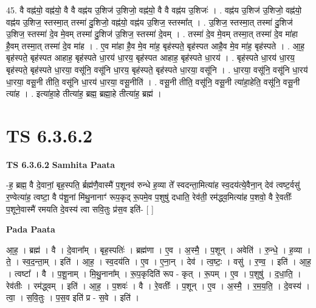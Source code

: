 \documentclass[17pt]{extarticle}
\begin{document}
45. वै वह्न॑यो॒ वह्न॑यो॒ वै वै वह्न॑य उ॒शिज॑ उ॒शिजो॒ वह्न॑यो॒ वै वै वह्न॑य उ॒शिजः॑ । . वह्न॑य उ॒शिज॑ उ॒शिजो॒ वह्न॑यो॒ वह्न॑य उ॒शिज॒ स्तस्मा॒त् तस्मा॑ दु॒शिजो॒ वह्न॑यो॒ वह्न॑य उ॒शिज॒ स्तस्मा᳚त् । . उ॒शिज॒ स्तस्मा॒त् तस्मा॑ दु॒शिज॑ उ॒शिज॒ स्तस्मा॑ दे॒व मे॒वम् तस्मा॑ दु॒शिज॑ उ॒शिज॒ स्तस्मा॑ दे॒वम् । . तस्मा॑ दे॒व मे॒वम् तस्मा॒त् तस्मा॑ दे॒व मा॑हा है॒वम् तस्मा॒त् तस्मा॑ दे॒व मा॑ह । . ए॒व मा॑हा है॒व मे॒व मा॑ह॒ बृह॑स्पते॒ बृह॑स्पत आहै॒व मे॒व मा॑ह॒ बृह॑स्पते । . आ॒ह॒ बृह॑स्पते॒ बृह॑स्पत आहाह॒ बृह॑स्पते धा॒रय॑ धा॒रय॒ बृह॑स्पत आहाह॒ बृह॑स्पते धा॒रय॑ । . बृह॑स्पते धा॒रय॑ धा॒रय॒ बृह॑स्पते॒ बृह॑स्पते धा॒रया॒ वसू॑नि॒ वसू॑नि धा॒रय॒ बृह॑स्पते॒ बृह॑स्पते धा॒रया॒ वसू॑नि । . धा॒रया॒ वसू॑नि॒ वसू॑नि धा॒रय॑ धा॒रया॒ वसू॒नी तीति॒ वसू॑नि धा॒रय॑ धा॒रया॒ वसू॒नीति॑ । . वसू॒नी तीति॒ वसू॑नि॒ वसू॒नी त्या॑हा॒हेति॒ वसू॑नि॒ वसू॒नी त्या॑ह । . इत्या॑हा॒हे तीत्या॑ह॒ ब्रह्म॒ ब्रह्मा॒हे तीत्या॑ह॒ ब्रह्म॑ । \newline
\pagebreak
{}

\section{ TS 6.3.6.2 }

\textbf{TS 6.3.6.2 } \newline
\textbf{Samhita Paata} \newline

-ह॒ ब्रह्म॒ वै दे॒वानां॒ बृह॒स्पति॒ र्ब्रह्म॑णै॒वास्मै॑ प॒शूनव॑ रुन्धे ह॒व्या ते᳚ स्वदन्ता॒मित्या॑ह स्व॒दय॑त्ये॒वैना॒न् देव॑ त्वष्ट॒र्वसु॑ र॒ण्वेत्या॑ह॒ त्वष्टा॒ वै प॑शू॒नां मि॑थु॒नानाꣳ॑ रूप॒कृद् रू॒पमे॒व प॒शुषु॑ दधाति॒ रेव॑ती॒ रम॑द्ध्व॒मित्या॑ह प॒शवो॒ वै रे॒वतीः᳚ प॒शूने॒वास्मै॑ रमयति दे॒वस्य॑ त्वा सवि॒तुः प्र॑स॒व इति॑- [  ] \newline

\textbf{Pada Paata} \newline

आ॒ह॒ । ब्रह्म॑ । वै । दे॒वाना᳚म् । बृह॒स्पतिः॑ । ब्रह्म॑णा । ए॒व । अ॒स्मै॒ । प॒शून् । अवेति॑ । रु॒न्धे॒ । ह॒व्या । ते॒ । स्व॒द॒न्ता॒म् । इति॑ । आ॒ह॒ । स्व॒दय॑ति । ए॒व । ए॒ना॒न् । देव॑ । त्व॒ष्टः॒ । वसु॑ । र॒ण्व॒ । इति॑ । आ॒ह॒ । त्वष्टा᳚ । वै । प॒शू॒नाम् । मि॒थु॒नाना᳚म् । रू॒प॒कृदिति॑ रूप - कृत् । रू॒पम् । ए॒व । प॒शुषु॑ । द॒धा॒ति॒ । रेव॑तीः । रम॑द्ध्वम् । इति॑ । आ॒ह॒ । प॒शवः॑ । वै । रे॒वतीः᳚ । प॒शून् । ए॒व । अ॒स्मै॒ । र॒म॒य॒ति॒ । दे॒वस्य॑ । त्वा॒ । स॒वि॒तुः । प॒स॒व इति॑ प्र - स॒वे । इति॑ ।  \newline
\end{document}
